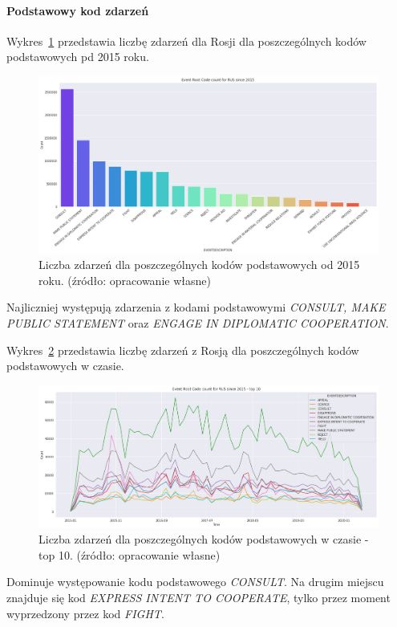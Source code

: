 \documentclass[11pt]{report}
\begin{document}
    \paragraph{Podstawowy kod zdarzeń}

    Wykres~\ref{fig:RUSPERC} przedstawia liczbę zdarzeń dla Rosji dla poszczególnych kodów podstawowych pd 2015 roku.

    \begin{figure}[!htp]
        \centering
        \includegraphics[width=\linewidth]{fig/RUS/RUSERC.png}
        \caption{Liczba zdarzeń dla poszczególnych kodów podstawowych od 2015 roku. (źródło: opracowanie własne)}
        \label{fig:RUSPERC}
    \end{figure}
    Najliczniej występują zdarzenia z kodami podstawowymi \textit{CONSULT, MAKE PUBLIC STATEMENT} oraz \textit{ENGAGE IN DIPLOMATIC COOPERATION}.

    Wykres~\ref{fig:RUSPERCinTIME} przedstawia liczbę zdarzeń z Rosją dla poszczególnych kodów podstawowych w czasie.
    \begin{figure}[!htp]
        \centering
        \includegraphics[width=\linewidth]{fig/RUS/RUSERCinTIME.png}
        \caption{Liczba zdarzeń dla poszczególnych kodów podstawowych w czasie - top 10. (źródło: opracowanie własne)}
        \label{fig:RUSPERCinTIME}
    \end{figure}
    Dominuje występowanie kodu podstawowego \textit{CONSULT}.
    Na drugim miejscu znajduje się kod \textit{EXPRESS INTENT TO COOPERATE}, tylko przez moment wyprzedzony przez kod \textit{FIGHT}.
\end{document}

